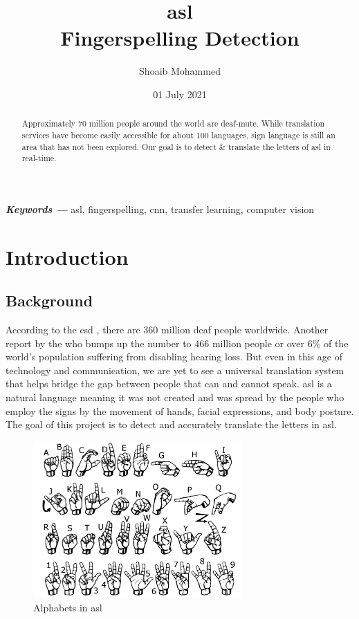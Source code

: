 \documentclass[twocolumn]{article}
\providecommand{\keywords}[1]
{
	\small
	\noindent \textbf{\textit{Keywords ---}} #1
}
\begin{document}
\setlength{\droptitle}{-5cm}
\title{\textbf{\gls{asl}\\
	Fingerspelling Detection}}
\author{Shoaib Mohammed}
\date{01 July 2021}
\maketitle


\begin{abstract}
Approximately 70 million people around the world are deaf-mute. While 
translation services have become easily accessible for about 100 
languages, sign language is still an area that has not been explored. 
Our goal is to detect \& translate the letters of \gls{asl} in real-time.
\end{abstract}

\keywords{\gls{asl}, fingerspelling, \gls{cnn}, transfer learning, 
computer vision}


\section{Introduction}

\subsection{Background}
According to the \gls{csd} \cite{csd}, there are 360 million deaf people 
worldwide. Another report by the \gls{who} \cite{who} bumps up the number to 
466 million people or over 6\% of the world's population suffering from 
disabling hearing loss. But even in this age of technology and communication, 
we are yet to see a universal translation system that helps bridge the gap 
between people that can and cannot speak. \gls{asl} is a natural language 
meaning it was not created and was spread by the people who employ the signs 
by the movement of hands, facial expressions, and body posture. The goal of 
this project is to detect and accurately translate the letters in \gls{asl}.

\begin{figure}[h]
\centering
\includegraphics[width=8cm]{./figures/asl alphabets}
\caption{Alphabets in \gls{asl}}
\label{asl alphabets}
\end{figure}
\end{document}
